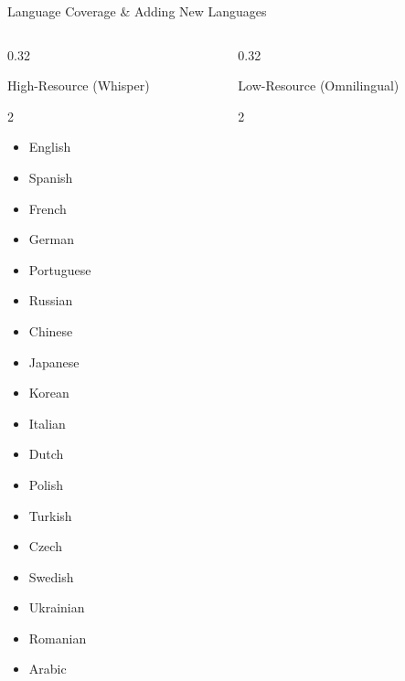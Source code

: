 \documentclass[aspectratio=169, 11pt]{beamer}
\begin{document}
\begin{frame}[fragile]{Language Coverage \& Adding New Languages}
    \begin{columns}[T]
        \begin{column}{0.32\textwidth}
            \begin{block}{\scriptsize High-Resource (Whisper)}
                \begin{multicols}{2}
                    \begin{itemize}
                        \tiny
                        \item English
                        \item Spanish
                        \item French
                        \item German
                        \item Portuguese
                        \item Russian
                        \item Chinese
                        \item Japanese
                        \item Korean
                        \item Italian
                        \item Dutch
                        \item Polish
                        \item Turkish
                        \item Czech
                        \item Swedish
                        \item Ukrainian
                        \item Romanian
                        \item Arabic
                    \end{itemize}
                \end{multicols}
            \end{block}
        \end{column}
        \begin{column}{0.32\textwidth}
            \begin{block}{\scriptsize Low-Resource (Omnilingual)}
                \begin{multicols}{2}
                    \begin{itemize}

\end{itemize}
\end{multicols}
\end{block}
\end{column}
\end{columns}
\end{frame}
\end{document}

